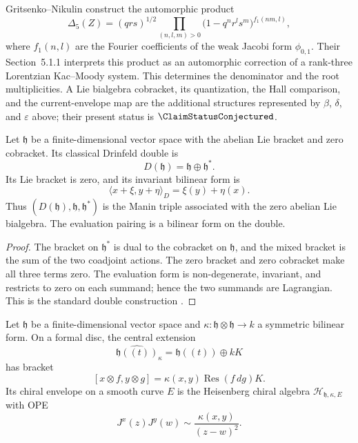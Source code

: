 \begin{convention}
Gritsenko--Nikulin construct the automorphic product
\cite[Example~2.4, equation~(2.16)]{GritsenkoNikulin1998}
\[
 \Delta_5(Z)
 =(qrs)^{1/2}
 \prod_{(n,l,m)>0}
 \bigl(1-q^nr^ls^m\bigr)^{f_1(nm,l)},
\]
where $f_1(n,l)$ are the Fourier coefficients of the weak Jacobi form
$\phi_{0,1}$.  Their Section~5.1.1 interprets this product as an
automorphic correction of a rank-three Lorentzian Kac--Moody system.
This determines the denominator and the root multiplicities.  A Lie
bialgebra cobracket, its quantization, the Hall comparison, and the
current-envelope map are the additional structures represented by
$\beta$, $\delta$, and $\varepsilon$ above; their present status is
$\ClaimStatusConjectured$.
\end{convention}

\begin{lemma}
\label{lem:master-delta-cartan-window}
Let $\mathfrak h$ be a finite-dimensional vector space with the
abelian Lie bracket and zero cobracket.  Its classical Drinfeld double
is
\[
D(\mathfrak h)=\mathfrak h\oplus\mathfrak h^*.
\]
Its Lie bracket is zero, and its invariant bilinear form is
\[
 \langle x+\xi,y+\eta\rangle_D
 =\xi(y)+\eta(x).
\]
Thus $(D(\mathfrak h),\mathfrak h,\mathfrak h^*)$ is the Manin triple
associated with the zero abelian Lie bialgebra.  The evaluation pairing
is a bilinear form on the double.
\end{lemma}

\begin{proof}
The bracket on $\mathfrak h^*$ is dual to the cobracket on
$\mathfrak h$, and the mixed bracket is the sum of the two coadjoint
actions.  The zero bracket and zero cobracket make all three terms
zero.  The evaluation form is non-degenerate, invariant, and restricts
to zero on each summand; hence the two summands are Lagrangian.  This
is the standard double construction
\cite[\S4]{EtingofSchiffmann98}.
\end{proof}

\begin{lemma}
\label{lem:master-epsilon-cartan-window}
Let $\mathfrak h$ be a finite-dimensional vector space and
$\kappa\colon\mathfrak h\otimes\mathfrak h\to k$ a symmetric
bilinear form.  On a formal disc, the central extension
\[
 \widehat{\mathfrak h((t))}_\kappa
 =\mathfrak h((t))\oplus kK
\]
has bracket
\[
 [x\otimes f,y\otimes g]
 =\kappa(x,y)\operatorname{Res}(f\,dg)K.
\]
Its chiral envelope on a smooth curve $E$ is the Heisenberg chiral
algebra $\mathcal H_{\mathfrak h,\kappa,E}$ with OPE
\[
 J^x(z)J^y(w)\sim\frac{\kappa(x,y)}{(z-w)^2}.
\]
\end{lemma}

